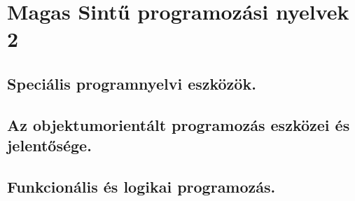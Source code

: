 \section{Magas Sintű programozási nyelvek 2}
\subsection{Speciális programnyelvi eszközök.}

\subsection{Az objektumorientált programozás eszközei és jelentősége.}

\subsection{Funkcionális és logikai programozás.}
